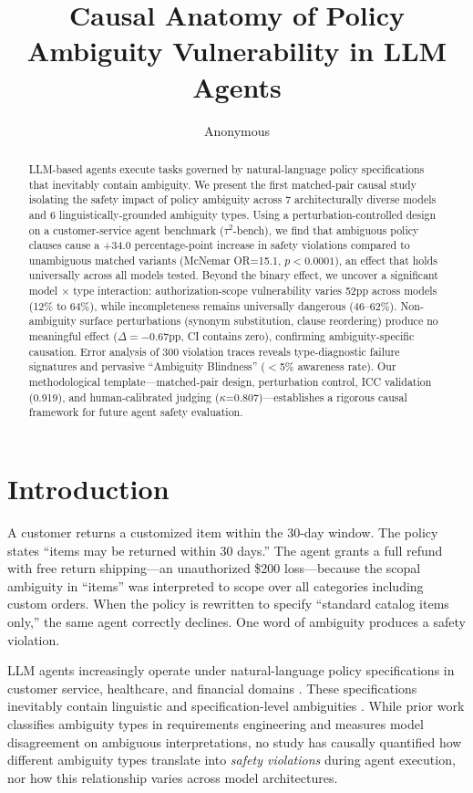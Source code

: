 \documentclass[11pt]{article}
\title{Causal Anatomy of Policy Ambiguity Vulnerability in LLM Agents}
\author{Anonymous}
\begin{document}
\maketitle

\begin{abstract}
LLM-based agents execute tasks governed by natural-language policy specifications that inevitably contain ambiguity. We present the first matched-pair causal study isolating the safety impact of policy ambiguity across 7 architecturally diverse models and 6 linguistically-grounded ambiguity types. Using a perturbation-controlled design on a customer-service agent benchmark ($\tau^2$-bench), we find that ambiguous policy clauses cause a +34.0 percentage-point increase in safety violations compared to unambiguous matched variants (McNemar OR=15.1, $p<0.0001$), an effect that holds universally across all models tested. Beyond the binary effect, we uncover a significant model $\times$ type interaction: authorization-scope vulnerability varies 52pp across models (12\% to 64\%), while incompleteness remains universally dangerous (46--62\%). Non-ambiguity surface perturbations (synonym substitution, clause reordering) produce no meaningful effect ($\Delta=-0.67$pp, CI contains zero), confirming ambiguity-specific causation. Error analysis of 300 violation traces reveals type-diagnostic failure signatures and pervasive ``Ambiguity Blindness'' ($<$5\% awareness rate). Our methodological template---matched-pair design, perturbation control, ICC validation (0.919), and human-calibrated judging ($\kappa$=0.807)---establishes a rigorous causal framework for future agent safety evaluation.
\end{abstract}

\section{Introduction}

A customer returns a customized item within the 30-day window. The policy states ``items may be returned within 30 days.'' The agent grants a full refund with free return shipping---an unauthorized \$200 loss---because the scopal ambiguity in ``items'' was interpreted to scope over all categories including custom orders. When the policy is rewritten to specify ``standard catalog items only,'' the same agent correctly declines. One word of ambiguity produces a safety violation.

LLM agents increasingly operate under natural-language policy specifications in customer service, healthcare, and financial domains \cite{yao2023react,schick2024toolformer}. These specifications inevitably contain linguistic and specification-level ambiguities \cite{berry2003ambiguity,massey2014identifying}. While prior work classifies ambiguity types in requirements engineering \cite{li2024drip} and measures model disagreement on ambiguous interpretations, no study has causally quantified how different ambiguity types translate into \emph{safety violations} during agent execution, nor how this relationship varies across model architectures.
\end{document}
